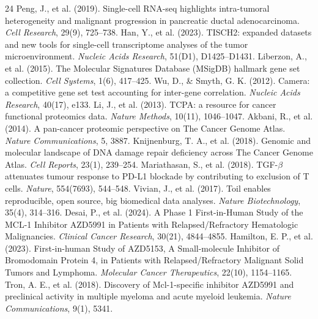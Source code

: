 \documentclass[10pt,twocolumn]{article}
\begin{document}
\begin{thebibliography}{24}
 Peng, J., et al. (2019). Single-cell RNA-seq highlights intra-tumoral heterogeneity and malignant progression in pancreatic ductal adenocarcinoma. \textit{Cell Research}, 29(9), 725--738.
 Han, Y., et al. (2023). TISCH2: expanded datasets and new tools for single-cell transcriptome analyses of the tumor microenvironment. \textit{Nucleic Acids Research}, 51(D1), D1425--D1431.
 Liberzon, A., et al. (2015). The Molecular Signatures Database (MSigDB) hallmark gene set collection. \textit{Cell Systems}, 1(6), 417--425.
 Wu, D., \& Smyth, G. K. (2012). Camera: a competitive gene set test accounting for inter-gene correlation. \textit{Nucleic Acids Research}, 40(17), e133.
 Li, J., et al. (2013). TCPA: a resource for cancer functional proteomics data. \textit{Nature Methods}, 10(11), 1046--1047.
 Akbani, R., et al. (2014). A pan-cancer proteomic perspective on The Cancer Genome Atlas. \textit{Nature Communications}, 5, 3887.
 Knijnenburg, T. A., et al. (2018). Genomic and molecular landscape of DNA damage repair deficiency across The Cancer Genome Atlas. \textit{Cell Reports}, 23(1), 239--254.
 Mariathasan, S., et al. (2018). TGF-$\beta$ attenuates tumour response to PD-L1 blockade by contributing to exclusion of T cells. \textit{Nature}, 554(7693), 544--548.
 Vivian, J., et al. (2017). Toil enables reproducible, open source, big biomedical data analyses. \textit{Nature Biotechnology}, 35(4), 314--316.
 Desai, P., et al. (2024). A Phase 1 First-in-Human Study of the MCL-1 Inhibitor AZD5991 in Patients with Relapsed/Refractory Hematologic Malignancies. \textit{Clinical Cancer Research}, 30(21), 4844--4855.
 Hamilton, E. P., et al. (2023). First-in-human Study of AZD5153, A Small-molecule Inhibitor of Bromodomain Protein 4, in Patients with Relapsed/Refractory Malignant Solid Tumors and Lymphoma. \textit{Molecular Cancer Therapeutics}, 22(10), 1154--1165.
 Tron, A. E., et al. (2018). Discovery of Mcl-1-specific inhibitor AZD5991 and preclinical activity in multiple myeloma and acute myeloid leukemia. \textit{Nature Communications}, 9(1), 5341.
\end{thebibliography}
\endgroup
\end{document}
